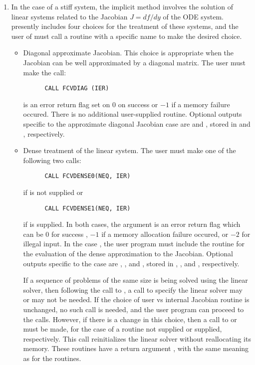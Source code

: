 \begin{enumerate}
\item
  In the case of a stiff system, the implicit  method involves the solution
  of linear systems related to the Jacobian $J = df/dy$ of the ODE system.
  {\cvode} presently includes four choices for the treatment of these systems,
  and the user of {\fcvode} must call a routine with a specific name to make the
  desired choice.

  \begin{itemize}
  \item {\s}
    Diagonal approximate Jacobian.
    This choice is appropriate when the Jacobian can be well approximated by
    a diagonal matrix.  The user must make the call:
\begin{verbatim}
      CALL FCVDIAG (IER)
\end{verbatim}
     is an error return flag set on $0$ on success or $-1$ if a memory 
    failure occured.
    There is no additional user-supplied routine.  Optional outputs specific
    to the approximate diagonal Jacobian case are  and , stored in
     and , respectively.
  \item {\s}
    Dense treatment of the linear system.
    The user must make one of the following two calls:
\begin{verbatim}
      CALL FCVDENSE0(NEQ, IER)
\end{verbatim}
    if  is not supplied or
\begin{verbatim}
      CALL FCVDENSE1(NEQ, IER)
\end{verbatim}
    if  is supplied.
    In both cases, the argument  is an error return flag which can be $0$ 
    for success , $-1$ if a memory allocation failure occured, or $-2$ for illegal input. 
    In the case , the user program must include the  routine 
    for the evaluation of the dense approximation to the Jacobian.
    Optional outputs specific to the {\dense} case are , , and ,
    stored in , , and , respectively.
    
    If a sequence of problems of the same size is being solved using the
    {\dense} linear solver, then following the call to , a call to specify
    the linear solver may or may not be needed.  If the choice of user vs internal
    Jacobian routine is unchanged, no such call is needed, and the user program can
    proceed to the  calls.  However, if there is a change in this choice, then
    a call to  or  must be made, for the case
    of a  routine not supplied or supplied, respectively.  This call
    reinitializes the {\dense} linear solver without reallocating its memory.
    These routines have a return argument , with the same meaning as for the
     routines.
    

\end{itemize}
\end{enumerate}
